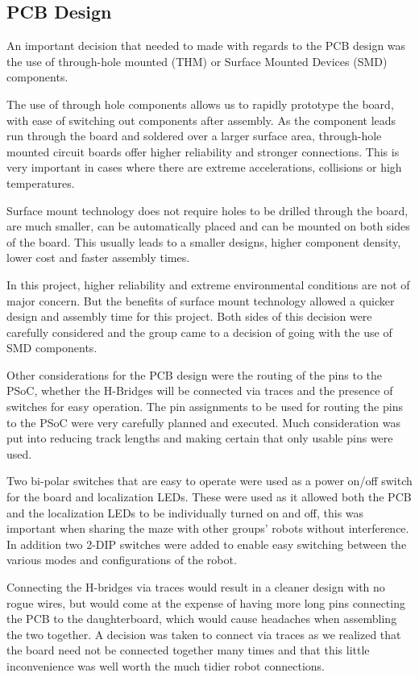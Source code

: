 \documentclass{article}
\begin{document}
\subsection{PCB Design}

An important decision that needed to made with regards to the PCB design was the use of through-hole mounted (THM) or Surface Mounted Devices (SMD) components.

The use of through hole components allows us to rapidly prototype the board, with ease of switching out components after assembly. As the component leads run through the board and soldered over a larger surface area, through-hole mounted circuit boards offer higher reliability and stronger connections. This is very important in cases where there are extreme accelerations, collisions or high temperatures.

Surface mount technology does not require holes to be drilled through the board, are much smaller, can be automatically placed and can be mounted on both sides of the board. This usually leads to a smaller designs, higher component density, lower cost and faster assembly times. 

In this project, higher reliability and extreme environmental conditions are not of major concern. But the benefits of surface mount technology allowed a quicker design and assembly time for this project. Both sides of this decision were carefully considered and the group came to a decision of going with the use of SMD components.

Other considerations for the PCB design were the routing of the pins to the PSoC, whether the H-Bridges will be connected via traces and the presence of switches for easy operation. The pin assignments to be used for routing the pins to the PSoC were very carefully planned and executed. Much consideration was put into reducing track lengths and making certain that only usable pins were used.

Two bi-polar switches that are easy to operate were used as a power on/off switch for the board and localization LEDs. These were used as it allowed both the PCB and the localization LEDs to be individually turned on and off, this was important when sharing the maze with other groups' robots without interference. In addition two 2-DIP switches were added to enable easy switching between the various modes and configurations of the robot.

Connecting the H-bridges via traces would result in a cleaner design with no rogue wires, but would come at the expense of having more long pins connecting the PCB to the daughterboard, which would cause headaches when assembling the two together. A decision was taken to connect via traces as we realized that the board need not be connected together many times and that this little inconvenience was well worth the much tidier robot connections.
\end{document}
